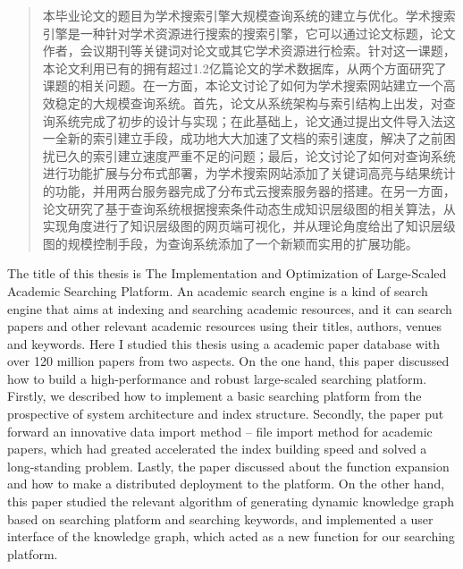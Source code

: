 
\begin{abstract}

\large 本毕业论文的题目为学术搜索引擎大规模查询系统的建立与优化。学术搜索引擎是一种针对学术资源进行搜索的搜索引擎，它可以通过论文标题，论文作者，会议期刊等关键词对论文或其它学术资源进行检索。针对这一课题，本论文利用已有的拥有超过1.2亿篇论文的学术数据库，从两个方面研究了课题的相关问题。在一方面，本论文讨论了如何为学术搜索网站建立一个高效稳定的大规模查询系统。首先，论文从系统架构与索引结构上出发，对查询系统完成了初步的设计与实现；在此基础上，论文通过提出文件导入法这一全新的索引建立手段，成功地大大加速了文档的索引速度，解决了之前困扰已久的索引建立速度严重不足的问题；最后，论文讨论了如何对查询系统进行功能扩展与分布式部署，为学术搜索网站添加了关键词高亮与结果统计的功能，并用两台服务器完成了分布式云搜索服务器的搭建。在另一方面，论文研究了基于查询系统根据搜索条件动态生成知识层级图的相关算法，从实现角度进行了知识层级图的网页端可视化，并从理论角度给出了知识层级图的规模控制手段，为查询系统添加了一个新颖而实用的扩展功能。

\end{abstract}

\begin{englishabstract}

The title of this thesis is The Implementation and Optimization of Large-Scaled Academic Searching Platform. An academic search engine is a kind of search engine that aims at indexing and searching academic resources, and it can search papers and other relevant academic resources using their titles, authors, venues and keywords. Here I studied this thesis using a academic paper database with over 120 million papers from two aspects. On the one hand, this paper discussed how to build a high-performance and robust large-scaled searching platform. Firstly, we described how to implement a basic searching platform from the prospective of system architecture and index structure. Secondly, the paper put forward an innovative data import method -- file import method for academic papers, which had greated accelerated the index building speed and solved a long-standing problem. Lastly, the paper discussed about the function expansion and how to make a distributed deployment to the platform. On the other hand, this paper studied the relevant algorithm of generating dynamic knowledge graph based on searching platform and searching keywords, and implemented a user interface of the knowledge graph, which acted as a new function for our searching platform.

\end{englishabstract}

